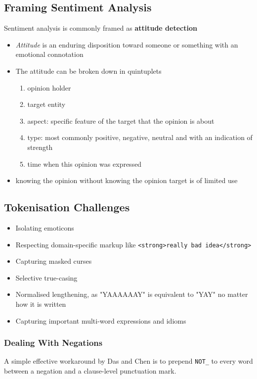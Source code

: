 \documentclass[11pt]{article}
\begin{document}
\subsection{Framing Sentiment Analysis}
Sentiment analysis is commonly framed as \textbf{attitude detection}
\begin{itemize}
	\item \emph{Attitude} is an enduring disposition toward someone or something with an emotional connotation
	\item The attitude can be broken down in quintuplets
	\begin{enumerate}
		\item opinion holder
		\item target entity
		\item aspect: specific feature of the target that the opinion is about
		\item type: most commonly {\color{green} positive}, {\color{red} negative}, {\color{gray} neutral} and with an indication of strength
		\item time when this opinion was expressed
	\end{enumerate}
	\item knowing the opinion without knowing the opinion target is of limited use
\end{itemize}

\subsection{Tokenisation Challenges}
\begin{itemize}
	\item Isolating emoticons
	\item Respecting domain-specific markup like \texttt{<strong>really bad idea</strong>}
	\item Capturing masked curses
	\item Selective true-casing
	\item Normalised lengthening, as "YAAAAAAY" is equivalent to "YAY" no matter how it is written
	\item Capturing important multi-word expressions and idioms
\end{itemize}

\subsubsection{Dealing With Negations}
A simple effective workaround by Das and Chen is to prepend \texttt{NOT\_} to every word between a negation and a clause-level punctuation mark.
\end{document}
